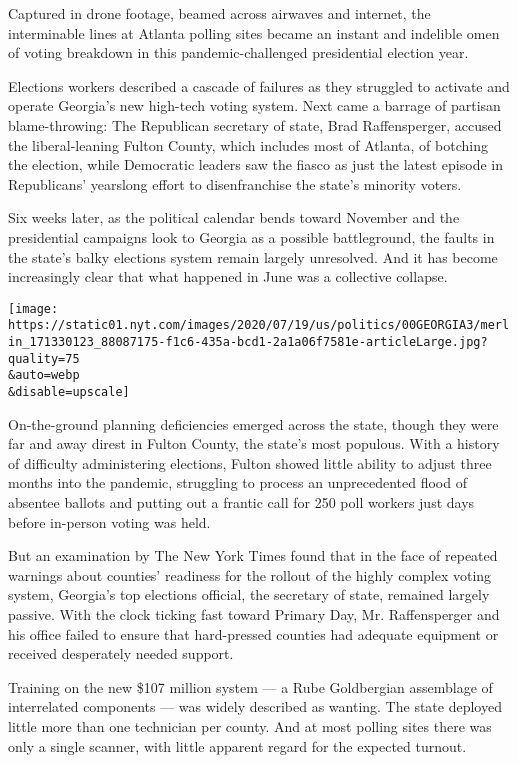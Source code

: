 Captured in drone footage, beamed across airwaves and internet, the
interminable lines at Atlanta polling sites became an instant and
indelible omen of voting breakdown in this pandemic-challenged
presidential election year.

Elections workers described a cascade of failures as they struggled to
activate and operate Georgia's new high-tech voting system. Next came a
barrage of partisan blame-throwing: The Republican secretary of state,
Brad Raffensperger, accused the liberal-leaning Fulton County, which
includes most of Atlanta, of botching the election, while Democratic
leaders saw the fiasco as just the latest episode in Republicans'
yearslong effort to disenfranchise the state's minority voters.

Six weeks later, as the political calendar bends toward November and the
presidential campaigns look to Georgia as a possible battleground, the
faults in the state's balky elections system remain largely unresolved.
And it has become increasingly clear that what happened in June was a
collective collapse.

\texttt{[image: https://static01.nyt.com/images/2020/07/19/us/politics/00GEORGIA3/merlin\_171330123\_88087175-f1c6-435a-bcd1-2a1a06f7581e-articleLarge.jpg?quality=75\\\&auto=webp\\\&disable=upscale]}

On-the-ground planning deficiencies emerged across the state, though
they were far and away direst in Fulton County, the state's most
populous. With a history of difficulty administering elections, Fulton
showed little ability to adjust three months into the pandemic,
struggling to process an unprecedented flood of absentee ballots and
putting out a frantic call for 250 poll workers just days before
in-person voting was held.

But an examination by The New York Times found that in the face of
repeated warnings about counties' readiness for the rollout of the
highly complex voting system, Georgia's top elections official, the
secretary of state, remained largely passive. With the clock ticking
fast toward Primary Day, Mr. Raffensperger and his office failed to
ensure that hard-pressed counties had adequate equipment or received
desperately needed support.

Training on the new \$107 million system --- a Rube Goldbergian
assemblage of interrelated components --- was widely described as
wanting. The state deployed little more than one technician per county.
And at most polling sites there was only a single scanner, with little
apparent regard for the expected turnout.

